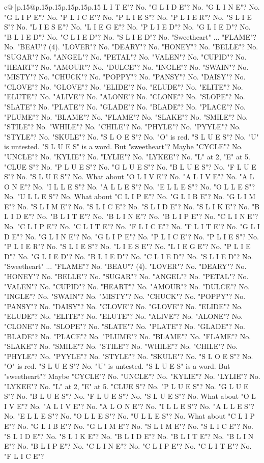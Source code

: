 \documentclass{article}
\begin{document}
{\begin{supertabular}{c@{$\;$}|p{.15\linewidth}@{}p{.15\linewidth}p{.15\linewidth}p{.15\linewidth}p{.15\linewidth}p{.15\linewidth}}
{{{L I T E"? No. "G L I D E"? No. "G L I N E"? No. "G L I P E"? No. "P L I C E"? No. "P L I E S"? No. "P L I E R"? No. "S L I E S"? No. "L I E S E"? No. "L I E G E"? No. "P L I E D"? No. "G L I E D"? No. "B L I E D"? No. "C L I E D"? No. "S L I E D"? No. "Sweetheart" ... "FLAME"? No. "BEAU"? (4). "LOVER"? No. "DEARY"? No. "HONEY"? No. "BELLE"? No. "SUGAR"? No. "ANGEL"? No. "PETAL"? No. "VALEN"? No. "CUPID"? No. "HEART"? No. "AMOUR"? No. "DULCE"? No. "INGLE"? No. "SWAIN"? No. "MISTY"? No. "CHUCK"? No. "POPPY"? No. "PANSY"? No. "DAISY"? No. "CLOVE"? No. "GLOVE"? No. "ELIDE"? No. "ELUDE"? No. "ELITE"? No. "ELUTE"? No. "ALIVE"? No. "ALONE"? No. "CLONE"? No. "SLOPE"? No. "SLATE"? No. "PLATE"? No. "GLADE"? No. "BLADE"? No. "PLACE"? No. "PLUME"? No. "BLAME"? No. "FLAME"? No. "SLAKE"? No. "SMILE"? No. "STILE"? No. "WHILE"? No. "CHILE"? No. "PHYLE"? No. "PYYLE"? No. "STYLE"? No. "SKULE"? No. "S L O E S"? No. "O" is red. "S L U E S"? No. "U" is untested. "S L U E S" is a word. But "sweetheart"? Maybe "CYCLE"? No. "UNCLE"? No. "KYLIE"? No. "LYLIE"? No. "LYKEE"? No. "L" at 2, "E" at 5. "CLUE S"? No. "P L U E S"? No. "G L U E S"? No. "B L U E S"? No. "F L U E S"? No. "S L U E S"? No. What about "O L I V E"? No. "A L I V E"? No. "A L O N E"? No. "I L L E S"? No. "A L L E S"? No. "E L L E S"? No. "O L L E S"? No. "U L L E S"? No. What about "C L I P E"? No. "G L I B E"? No. "G L I M E"? No. "S L I M E"? No. "S L I C E"? No. "S L I D E"? No. "S L I K E"? No. "B L I D E"? No. "B L I T E"? No. "B L I N E"? No. "B L I P E"? No. "C L I N E"? No. "C L I P E"? No. "C L I T E"? No. "F L I C E"? No. "F L I T E"? No. "G L I D E"? No. "G L I N E"? No. "G L I P E"? No. "P L I C E"? No. "P L I E S"? No. "P L I E R"? No. "S L I E S"? No. "L I E S E"? No. "L I E G E"? No. "P L I E D"? No. "G L I E D"? No. "B L I E D"? No. "C L I E D"? No. "S L I E D"? No. "Sweetheart" ... "FLAME"? No. "BEAU"? (4). "LOVER"? No. "DEARY"? No. "HONEY"? No. "BELLE"? No. "SUGAR"? No. "ANGEL"? No. "PETAL"? No. "VALEN"? No. "CUPID"? No. "HEART"? No. "AMOUR"? No. "DULCE"? No. "INGLE"? No. "SWAIN"? No. "MISTY"? No. "CHUCK"? No. "POPPY"? No. "PANSY"? No. "DAISY"? No. "CLOVE"? No. "GLOVE"? No. "ELIDE"? No. "ELUDE"? No. "ELITE"? No. "ELUTE"? No. "ALIVE"? No. "ALONE"? No. "CLONE"? No. "SLOPE"? No. "SLATE"? No. "PLATE"? No. "GLADE"? No. "BLADE"? No. "PLACE"? No. "PLUME"? No. "BLAME"? No. "FLAME"? No. "SLAKE"? No. "SMILE"? No. "STILE"? No. "WHILE"? No. "CHILE"? No. "PHYLE"? No. "PYYLE"? No. "STYLE"? No. "SKULE"? No. "S L O E S"? No. "O" is red. "S L U E S"? No. "U" is untested. "S L U E S" is a word. But "sweetheart"? Maybe "CYCLE"? No. "UNCLE"? No. "KYLIE"? No. "LYLIE"? No. "LYKEE"? No. "L" at 2, "E" at 5. "CLUE S"? No. "P L U E S"? No. "G L U E S"? No. "B L U E S"? No. "F L U E S"? No. "S L U E S"? No. What about "O L I V E"? No. "A L I V E"? No. "A L O N E"? No. "I L L E S"? No. "A L L E S"? No. "E L L E S"? No. "O L L E S"? No. "U L L E S"? No. What about "C L I P E"? No. "G L I B E"? No. "G L I M E"? No. "S L I M E"? No. "S L I C E"? No. "S L I D E"? No. "S L I K E"? No. "B L I D E"? No. "B L I T E"? No. "B L I N E"? No. "B L I P E"? No. "C L I N E"? No. "C L I P E"? No. "C L I T E"? No. "F L I C E"? }}}
\end{supertabular}}
\end{document}
